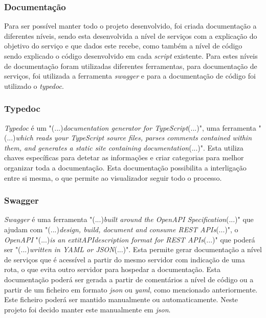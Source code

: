 \subsubsection{Documentação}
Para ser possível manter todo o projeto desenvolvido, foi criada documentação a diferentes níveis, sendo esta desenvolvida a nível de serviços com a explicação do objetivo do serviço e que dados este recebe, como também a nível de código sendo explicado o código desenvolvido em cada \textit{script} existente. Para estes níveis de documentação foram utilizadas diferentes ferramentas, para documentação de serviços, foi utilizada a ferramenta \textit{swagger} e para a documentação de código foi utilizado o \textit{typedoc}.

\subsubsection{Typedoc}

\textit{Typedoc} é um "(...)\emph{documentation generator for TypeScript}(...)"\citep{typedoc}, uma ferramenta "(...)\emph{which reads your TypeScript source files, parses comments contained within them, and generates a static site containing documentation}(...)"\citep{typedoc}. Esta utiliza chaves específicas para detetar as informações e criar categorias para melhor organizar toda a documentação. Esta documentação possibilita a interligação entre si mesma, o que permite ao visualizador seguir todo o processo.

\newpage

\subsubsection{Swagger}

\textit{Swagger} é uma ferramenta "(...)\emph{built around the OpenAPI Specification}(...)"\citep{swagger} que ajudam com "(...)\emph{design, build, document and consume REST APIs}(...)"\citep{swagger}, o \emph{OpenAPI} "(...)\emph{is an	extit{API}description format for REST APIs}(...)"\citep{swagger} que poderá ser "(...)\emph{written in YAML or JSON}(...)"\citep{swagger}. Esta permite gerar documentação a nível de serviços que é acessível a partir do mesmo servidor com indicação de uma rota, o que evita outro servidor para hospedar a documentação. Esta documentação poderá ser gerada a partir de comentários a nível de código ou a partir de um ficheiro em formato \textit{\acrshort{json}} ou \textit{yaml}, como mencionado anteriormente. Este ficheiro poderá ser mantido manualmente ou automaticamente. Neste projeto foi decido manter este manualmente em \textit{\acrshort{json}}.
